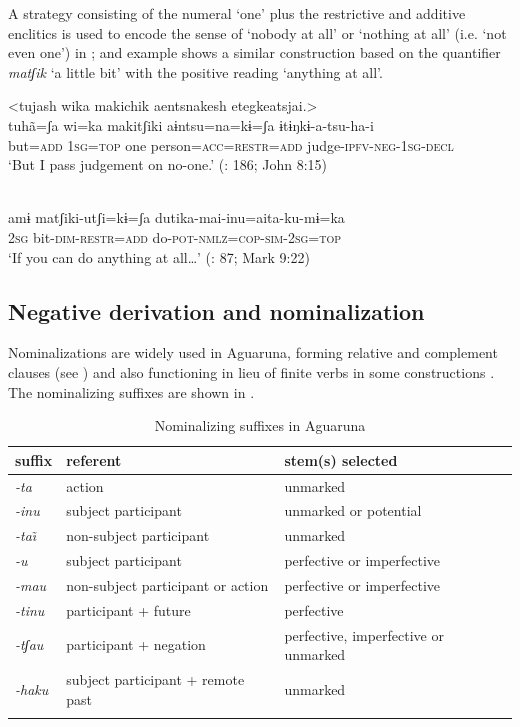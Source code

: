 \documentclass[output=paper,colorlinks,citecolor=brown,draft]{langscibook}
\begin{document}
A strategy consisting of the numeral ‘one’ plus the restrictive and additive enclitics is used to encode the sense of ‘nobody at all’ or ‘nothing at all’ (i.e. ‘not even one’) in ; and example  shows a similar construction based on the quantifier \textit{matʃik} ‘a little bit’ with the positive reading ‘anything at all’.

\ea\label{ex:agu:50}
    \glll <tujash wika makichik aentsnakesh etegkeatsjai.>\\ 
          tuhã=ʃa  wi=ka  makitʃiki  aɨntsu=na=kɨ=ʃa ɨtɨŋkɨ{}-a-tsu-ha-i \\
          but=\textsc{add}  \textsc{1sg=top}  one  person=\textsc{acc=restr=add} judge-\textsc{ipfv-neg-1sg-decl} \\
    \glt ‘But I pass judgement on no-one.’ (\citealt{LigaBíblica2008}: 186; John 8:15)
\z 

\ea\label{ex:agu:51}
     \\ 
          amɨ  matʃiki-utʃi=kɨ=ʃa  dutika-mai-inu=aita-ku-mɨ=ka \\
          \textsc{2sg}  bit-\textsc{dim-restr=add}  do-\textsc{pot-nmlz=cop-sim-2sg=top}\\ 
    \glt ‘If you can do anything at all…’ (\citealt{LigaBíblica2008}: 87; Mark 9:22)
\z 

\subsection{Negative derivation and nominalization}\label{sec:agu:3.3}

Nominalizations are widely used in Aguaruna, forming relative and complement clauses (see ) and also functioning in lieu of finite verbs in some constructions \citep{Overall2014}. The nominalizing suffixes are shown in .

\begin{table}
\begin{tabularx}{\textwidth}{llQ}
\lsptoprule
{suffix} & {referent} & {stem(s) selected}\\
\midrule
\textit{-ta} & {action} & {unmarked}\\
\textit{-inu} & {subject participant} & {unmarked or potential}\\
\textit{-ta\~\i} & {non-subject participant} & {unmarked}\\
\textit{-u} & {subject participant} & {perfective or imperfective}\\
\textit{-mau} & {non-subject participant or action} & {perfective or imperfective}\\
\textit{-tinu} & {participant + future} & {perfective}\\
\textit{-tʃau} & {participant + negation} & {perfective, imperfective or unmarked}\\
\textit{-haku} & {subject participant + remote past} & {unmarked}\\
\lspbottomrule
\end{tabularx}
\caption{Nominalizing suffixes in Aguaruna \citep[504]{Overall2017a}}
\label{tab:agu:5}
\end{table}
\end{document}
